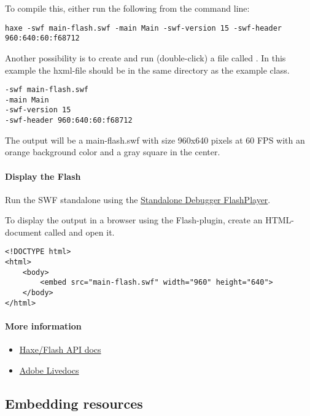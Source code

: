 To compile this, either run the following from the command line:

\begin{lstlisting}
haxe -swf main-flash.swf -main Main -swf-version 15 -swf-header 960:640:60:f68712
\end{lstlisting}

Another possibility is to create and run (double-click) a file called . In this example the hxml-file should be in the same directory as the example class.

\begin{lstlisting}
-swf main-flash.swf
-main Main
-swf-version 15
-swf-header 960:640:60:f68712
\end{lstlisting}

The output will be a main-flash.swf with size 960x640 pixels at 60 FPS with an orange background color and a gray square in the center.

\paragraph{Display the Flash}

Run the SWF standalone using the \href{https://www.adobe.com/support/flashplayer/downloads.html}{Standalone Debugger FlashPlayer}. 

To display the output in a browser using the Flash-plugin, create an HTML-document called  and open it.

\begin{lstlisting}
<!DOCTYPE html>
<html>
	<body>
		<embed src="main-flash.swf" width="960" height="640">
	</body>
</html>
\end{lstlisting}

\paragraph{More information}

\begin{itemize}
	\item \href{http://api.haxe.org/flash/}{Haxe/Flash API docs}
	\item \href{http://help.adobe.com/en_US/FlashPlatform/reference/actionscript/3/}{Adobe Livedocs}
\end{itemize}

\subsection{Embedding resources}
\label{target-flash-resources}

